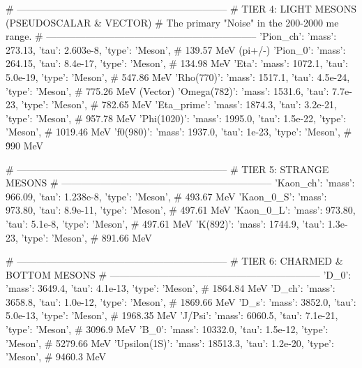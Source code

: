 {    \# \------------------------------------------------------------------  
    \# TIER 4: LIGHT MESONS (PSEUDOSCALAR & VECTOR)  
    \# The primary "Noise" in the 200-2000 me range.  
    \# \------------------------------------------------------------------  
    'Pion\_ch':     {'mass': 273.13,        'tau': 2.603e-8,  'type': 'Meson'},     \# 139.57 MeV (pi+/-)  
    'Pion\_0':      {'mass': 264.15,        'tau': 8.4e-17,   'type': 'Meson'},     \# 134.98 MeV  
    'Eta':         {'mass': 1072.1,        'tau': 5.0e-19,   'type': 'Meson'},     \# 547.86 MeV  
    'Rho(770)':    {'mass': 1517.1,        'tau': 4.5e-24,   'type': 'Meson'},     \# 775.26 MeV (Vector)  
    'Omega(782)':  {'mass': 1531.6,        'tau': 7.7e-23,   'type': 'Meson'},     \# 782.65 MeV  
    'Eta\_prime':   {'mass': 1874.3,        'tau': 3.2e-21,   'type': 'Meson'},     \# 957.78 MeV  
    'Phi(1020)':   {'mass': 1995.0,        'tau': 1.5e-22,   'type': 'Meson'},     \# 1019.46 MeV  
    'f0(980)':     {'mass': 1937.0,        'tau': 1e-23,     'type': 'Meson'},     \# \~990 MeV

    \# \------------------------------------------------------------------  
    \# TIER 5: STRANGE MESONS  
    \# \------------------------------------------------------------------  
    'Kaon\_ch':     {'mass': 966.09,        'tau': 1.238e-8,  'type': 'Meson'},     \# 493.67 MeV  
    'Kaon\_0\_S':    {'mass': 973.80,        'tau': 8.9e-11,   'type': 'Meson'},     \# 497.61 MeV  
    'Kaon\_0\_L':    {'mass': 973.80,        'tau': 5.1e-8,    'type': 'Meson'},     \# 497.61 MeV  
    'K\*(892)':     {'mass': 1744.9,        'tau': 1.3e-23,   'type': 'Meson'},     \# 891.66 MeV

    \# \------------------------------------------------------------------  
    \# TIER 6: CHARMED & BOTTOM MESONS  
    \# \------------------------------------------------------------------  
    'D\_0':         {'mass': 3649.4,        'tau': 4.1e-13,   'type': 'Meson'},     \# 1864.84 MeV  
    'D\_ch':        {'mass': 3658.8,        'tau': 1.0e-12,   'type': 'Meson'},     \# 1869.66 MeV  
    'D\_s':         {'mass': 3852.0,        'tau': 5.0e-13,   'type': 'Meson'},     \# 1968.35 MeV  
    'J/Psi':       {'mass': 6060.5,        'tau': 7.1e-21,   'type': 'Meson'},     \# 3096.9 MeV  
    'B\_0':         {'mass': 10332.0,       'tau': 1.5e-12,   'type': 'Meson'},     \# 5279.66 MeV  
    'Upsilon(1S)': {'mass': 18513.3,       'tau': 1.2e-20,   'type': 'Meson'},     \# 9460.3 MeV

}
